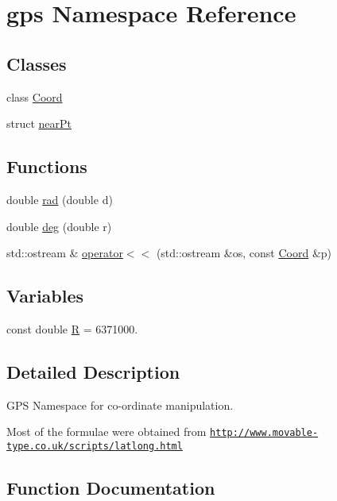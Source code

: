 \hypertarget{namespacegps}{}\section{gps Namespace Reference}
\label{namespacegps}
\subsection*{Classes}
\begin{DoxyCompactItemize}
\item 
class \hyperlink{classgps_1_1Coord}{Coord}
\item 
struct \hyperlink{structgps_1_1nearPt}{near\+Pt}
\end{DoxyCompactItemize}
\subsection*{Functions}
\begin{DoxyCompactItemize}
\item 
double \hyperlink{namespacegps_ad44ea39876137fc96774486e3a60f004}{rad} (double d)
\item 
double \hyperlink{namespacegps_a5c00877fe5fce323f1c834c324018c8f}{deg} (double r)
\item 
std\+::ostream \& \hyperlink{namespacegps_a5fb543469635387159ce1b8e24f6f78a}{operator$<$$<$} (std\+::ostream \&os, const \hyperlink{classgps_1_1Coord}{Coord} \&p)
\end{DoxyCompactItemize}
\subsection*{Variables}
\begin{DoxyCompactItemize}
\item 
const double \hyperlink{namespacegps_a336bcadf804afba736e0cf773b5a36e8}{R} = 6371000.
\end{DoxyCompactItemize}


\subsection{Detailed Description}
G\+PS Namespace for co-\/ordinate manipulation.

Most of the formulae were obtained from \href{http://www.movable-type.co.uk/scripts/latlong.html}{\tt http\+://www.\+movable-\/type.\+co.\+uk/scripts/latlong.\+html} 

\subsection{Function Documentation}
